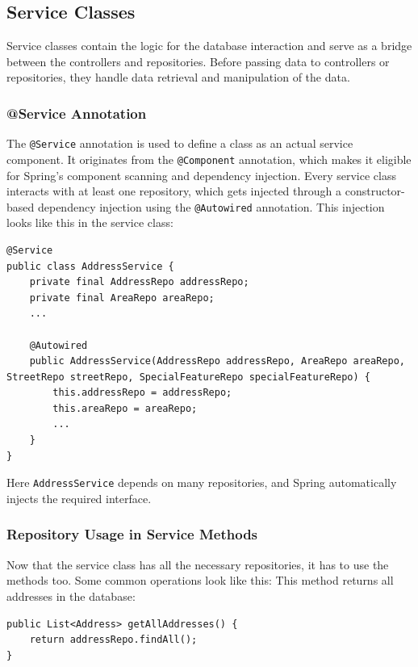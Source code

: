     \subsection{Service Classes}
    Service classes contain the logic for the database interaction and serve as a bridge between the controllers and repositories. Before passing data to controllers or repositories, they handle data retrieval and manipulation of the data.

    \subsubsection{@Service Annotation}
    The \texttt{@Service} annotation is used to define a class as an actual service component. It originates from the \texttt{@Component} annotation, which makes it eligible for Spring's component scanning and dependency injection. \newline
    Every service class interacts with at least one repository, which gets injected through a constructor-based dependency injection using the \texttt{@Autowired} annotation. This injection looks like this in the service class: 
    \lstset{style=java, caption=Repository Injection and @Service}
    \begin{verbatim}
@Service
public class AddressService {        
    private final AddressRepo addressRepo;
    private final AreaRepo areaRepo;
    ...

    @Autowired
    public AddressService(AddressRepo addressRepo, AreaRepo areaRepo, StreetRepo streetRepo, SpecialFeatureRepo specialFeatureRepo) {
        this.addressRepo = addressRepo;
        this.areaRepo = areaRepo;
        ...
    }
}
    \end{verbatim}
    Here \texttt{AddressService} depends on many repositories, and Spring automatically injects the required interface. 

    \subsubsection{Repository Usage in Service Methods}
    Now that the service class has all the necessary repositories, it has to use the methods too. Some common operations look like this: \newline
    This method returns all addresses in the database: 
    \lstset{style=java, caption=Fetching all Addresses}
    \begin{verbatim}
public List<Address> getAllAddresses() {
    return addressRepo.findAll();
}
    \end{verbatim}

